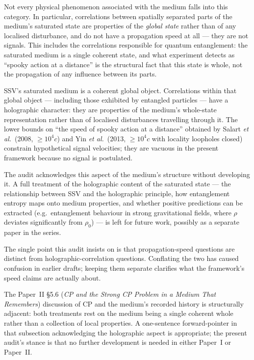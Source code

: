 \documentclass[11pt,a4paper]{article}
\begin{document}
Not every physical phenomenon associated with the medium falls into this
category.  In particular, correlations between spatially separated
parts of the medium's saturated state are properties of the
\emph{global state} rather than of any localised disturbance, and do
not have a propagation speed at all --- they are not signals.  This
includes the correlations responsible for quantum entanglement: the
saturated medium is a single coherent state, and what experiment
detects as ``spooky action at a distance'' is the structural fact that
this state is whole, not the propagation of any influence between its
parts.

\begin{notebox}
SSV's saturated medium is a coherent global object.  Correlations within
that global object --- including those exhibited by entangled particles
--- have a holographic character: they are properties of the medium's
whole-state representation rather than of localised disturbances
travelling through it.  The lower bounds on ``the speed of spooky action
at a distance'' obtained by Salart \emph{et al.}\ (2008, $\geq 10^4 c$)
and Yin \emph{et al.}\ (2013, $\geq 10^4 c$ with locality loopholes
closed) constrain hypothetical signal velocities; they are vacuous in
the present framework because no signal is postulated.

The audit acknowledges this aspect of the medium's structure without
developing it.  A full treatment of the holographic content of the
saturated state --- the relationship between SSV and the holographic
principle, how entanglement entropy maps onto medium properties, and
whether positive predictions can be extracted (e.g.\ entanglement
behaviour in strong gravitational fields, where $\rho$ deviates
significantly from $\rho_0$) --- is left for future work, possibly as
a separate paper in the series.

The single point this audit insists on is that propagation-speed
questions are distinct from holographic-correlation questions.
Conflating the two has caused confusion in earlier drafts; keeping
them separate clarifies what the framework's speed claims are
actually about.
\end{notebox}

The Paper~II \S5.6 (\emph{CP and the Strong CP Problem in a Medium That
Remembers}) discussion of CP and the medium's recorded
history is structurally adjacent: both treatments rest on the medium
being a single coherent whole rather than a collection of local
properties.  A one-sentence forward-pointer in that subsection
acknowledging the holographic aspect is appropriate; the present
audit's stance is that no further development is needed in either
Paper~I or Paper~II.
\end{document}

